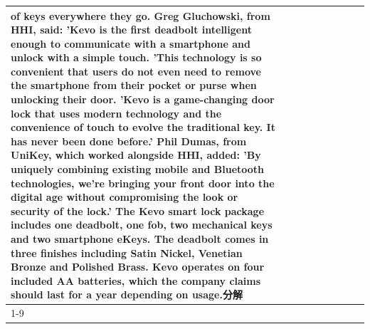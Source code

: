 \begin{table}[H]
\begin{tabular}{lllrlllll}
of keys everywhere they go. Greg Gluchowski, from HHI, said: 'Kevo is the first deadbolt intelligent enough to communicate with a smartphone and unlock with a simple touch. 'This technology is so convenient that users do not even need to remove the smartphone from their pocket or purse when unlocking their door. 'Kevo is a game-changing door lock that uses modern technology and the convenience of touch to evolve the traditional key. It has never been done before.' Phil Dumas, from UniKey, which worked alongside HHI, added: 'By uniquely combining existing mobile and Bluetooth technologies, we’re bringing your front door into the digital age without compromising the look or security of the lock.' The Kevo smart lock package includes one deadbolt, one fob, two mechanical keys and two smartphone eKeys. The deadbolt comes in three finishes including Satin Nickel, Venetian Bronze and Polished Brass. Kevo operates on four included AA batteries, which the company claims should last for a year depending on usage.分解 \\
\cline{1-9}

\end{tabular}
\end{table}
